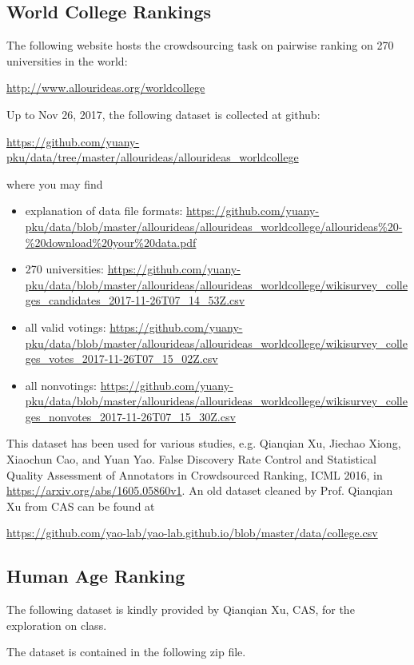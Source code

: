 \documentclass[11pt]{article}
\begin{document}
\subsection{World College Rankings}
The following website hosts the crowdsourcing task on pairwise ranking on 270 universities in the world:

\url{http://www.allourideas.org/worldcollege}

Up to Nov 26, 2017, the following dataset is collected at github:

\url{https://github.com/yuany-pku/data/tree/master/allourideas/allourideas_worldcollege}

\noindent where you may find 

\begin{itemize}
\item explanation of data file formats: \url{https://github.com/yuany-pku/data/blob/master/allourideas/allourideas_worldcollege/allourideas%20-%20download%20your%20data.pdf}
\item 270 universities: \url{https://github.com/yuany-pku/data/blob/master/allourideas/allourideas_worldcollege/wikisurvey_colleges_candidates_2017-11-26T07_14_53Z.csv}
\item all valid votings: \url{https://github.com/yuany-pku/data/blob/master/allourideas/allourideas_worldcollege/wikisurvey_colleges_votes_2017-11-26T07_15_02Z.csv}
\item all nonvotings: \url{https://github.com/yuany-pku/data/blob/master/allourideas/allourideas_worldcollege/wikisurvey_colleges_nonvotes_2017-11-26T07_15_30Z.csv} 
\end{itemize}

This dataset has been used for various studies, e.g. Qianqian Xu, Jiechao Xiong, Xiaochun Cao, and Yuan Yao. False Discovery Rate Control and Statistical Quality Assessment of Annotators in Crowdsourced Ranking, ICML 2016, in \url{https://arxiv.org/abs/1605.05860v1}. An old dataset cleaned by Prof. Qianqian Xu from CAS can be found at

\url{https://github.com/yao-lab/yao-lab.github.io/blob/master/data/college.csv}

\subsection{Human Age Ranking}

The following dataset is kindly provided by Qianqian Xu, CAS, for the exploration on class. 

The dataset is contained in the following zip file.
\end{document}
